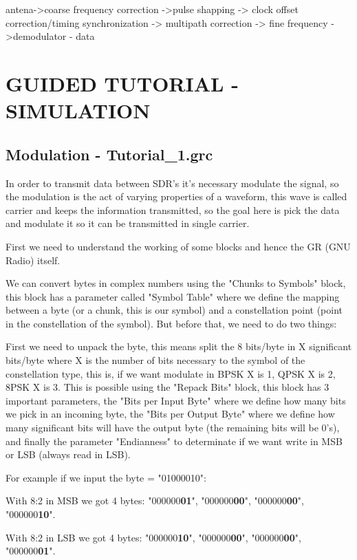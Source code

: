 \documentclass[a4paper, 10pt, conference]{ieeeconf}      %
\begin{document}
    antena->coarse frequency correction ->pulse shapping -> clock offset correction/timing synchronization -> multipath correction -> fine frequency ->demodulator - data
    
    

\section{GUIDED TUTORIAL - SIMULATION}
\subsection{Modulation - Tutorial\_1.grc}
    In order to transmit data between SDR's it's necessary modulate the signal, so the modulation is the act of varying properties of a waveform, this wave is called carrier and keeps the information transmitted, so the goal here is pick the data and modulate it so it can be transmitted in single carrier.
    
    First we need to understand the working of some blocks and hence the GR (GNU Radio) itself. 
    
    
    We can convert bytes in complex numbers using the "Chunks to Symbols" block, this block has a parameter called "Symbol Table" where we define the mapping between a byte (or a chunk, this is our symbol) and a constellation point (point in the constellation of the symbol). But before that, we need to do two things:
        
        First we need to unpack the byte, this means split the 8 bits/byte in X significant bits/byte where X is the number of bits necessary to the symbol of the constellation type, this is, if we want modulate in BPSK X is 1, QPSK X is 2, 8PSK X is 3.
        This is possible using the "Repack Bits" block, this block has 3 important parameters, the "Bits per Input Byte" where we define how many bits we pick in an incoming byte, the "Bits per Output Byte" where we define how many significant bits will have the output byte (the remaining bits will be 0's), and finally the parameter "Endianness" to determinate if we want write in MSB or LSB (always read in LSB). 
    
    For example if we input the byte = "01000010":
    
    With 8:2 in MSB we got 4 bytes: "000000\textbf{01}", "000000\textbf{00}", "000000\textbf{00}", "000000\textbf{10}".
    
    With 8:2 in LSB we got 4 bytes: "000000\textbf{10}", "000000\textbf{00}", "000000\textbf{00}", "000000\textbf{01}".
    
\end{document}
